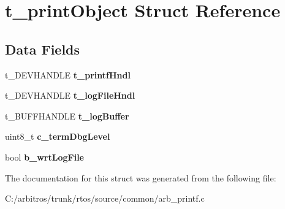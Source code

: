 \hypertarget{structt__print_object}{\section{t\-\_\-print\-Object Struct Reference}
\label{structt__print_object}
}
\subsection*{Data Fields}
\begin{DoxyCompactItemize}
\item 
\hypertarget{structt__print_object_ad2b7fe570973424832f1f79b7f8b6f00}{t\-\_\-\-D\-E\-V\-H\-A\-N\-D\-L\-E {\bfseries t\-\_\-printf\-Hndl}}\label{structt__print_object_ad2b7fe570973424832f1f79b7f8b6f00}

\item 
\hypertarget{structt__print_object_a17071c8871f0aaaf4c4275aa0c2a457f}{t\-\_\-\-D\-E\-V\-H\-A\-N\-D\-L\-E {\bfseries t\-\_\-log\-File\-Hndl}}\label{structt__print_object_a17071c8871f0aaaf4c4275aa0c2a457f}

\item 
\hypertarget{structt__print_object_a5177f0e345da2e023631f7d05ebb8191}{t\-\_\-\-B\-U\-F\-F\-H\-A\-N\-D\-L\-E {\bfseries t\-\_\-log\-Buffer}}\label{structt__print_object_a5177f0e345da2e023631f7d05ebb8191}

\item 
\hypertarget{structt__print_object_a071851466b2e0d470fca49ab4a21336e}{uint8\-\_\-t {\bfseries c\-\_\-term\-Dbg\-Level}}\label{structt__print_object_a071851466b2e0d470fca49ab4a21336e}

\item 
\hypertarget{structt__print_object_aa6c7b1d4c0ff22e021db6f996cb8fc2c}{bool {\bfseries b\-\_\-wrt\-Log\-File}}\label{structt__print_object_aa6c7b1d4c0ff22e021db6f996cb8fc2c}

\end{DoxyCompactItemize}


The documentation for this struct was generated from the following file\-:\begin{DoxyCompactItemize}
\item 
C\-:/arbitros/trunk/rtos/source/common/arb\-\_\-printf.\-c\end{DoxyCompactItemize}
